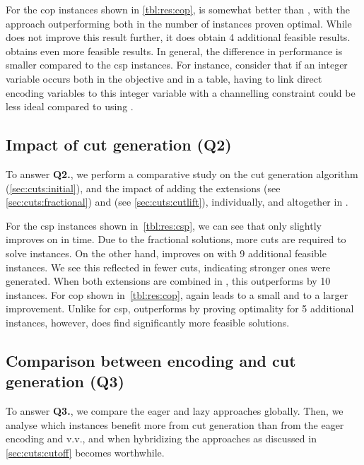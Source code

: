 \documentclass[a4paper,UKenglish,cleveref,autoref,thm-restate]{lipics-v2021}
\begin{document}
For the \gls{cop} instances shown in \cref{tbl:res:cop}, \baseGleb is somewhat better than \baseBool, with the \baseMddInput approach outperforming both in the number of instances proven optimal.
While \baseMddDomIncr does not improve this result further, it does obtain 4 additional feasible results.
\baseGleb obtains even more feasible results.
In general, the difference in performance is smaller compared to the \gls{csp} instances.
For instance, consider that if an integer variable occurs both in the objective and in a table, having to link direct encoding variables to this integer variable with a channelling constraint could be less ideal compared to using \baseGleb.

\subsection{Impact of cut generation (Q2)}
To answer \textbf{Q2.}, we perform a comparative study on the cut generation algorithm \lazyGenerate (\cref{sec:cuts:initial}), and the impact of adding the extensions \lazyFractional (see \cref{sec:cuts:fractional}) and \lazyCutlift (see \cref{sec:cuts:cutlift}), individually, and altogether in \lazyAll.

For the \gls{csp} instances shown in~\cref{tbl:res:csp}, we can see that \lazyFractional only slightly improves on \lazyGenerate in time.
Due to the fractional solutions, more cuts are required to solve instances.
On the other hand, \lazyCutlift improves on \lazyGenerate with 9 additional feasible instances.
We see this reflected in fewer cuts, indicating stronger ones were generated.
When both extensions are combined in \lazyAll, this outperforms \lazyCutlift by 10 instances.
For \gls{cop} shown in~\cref{tbl:res:cop}, again \lazyFractional leads to a small and \lazyCutlift to a larger improvement.
Unlike for \gls{csp}, \lazyCutlift outperforms \lazyAll by proving optimality for 5 additional instances, however, \lazyAll does find significantly more feasible solutions.


\subsection{Comparison between encoding and cut generation (Q3)}

To answer \textbf{Q3.}, we compare the eager and lazy approaches globally.
Then, we analyse which instances benefit more from cut generation than from the eager encoding and v.v., and when hybridizing the approaches as discussed in \cref{sec:cuts:cutoff} becomes worthwhile.
\end{document}
